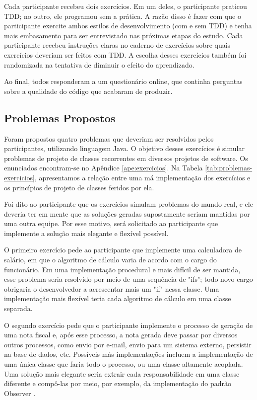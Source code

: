 \documentclass[conference]{IEEEtran}
\begin{document}
Cada participante recebeu dois exercícios. Em um deles, o participante praticou TDD; no outro,
ele programou sem a prática. A razão disso
é fazer com que o participante exercite ambos estilos de desenvolvimento (com e sem TDD)
e tenha mais embasamento para ser entrevistado nas próximas etapas do estudo. 
Cada participante recebeu instruções claras no caderno de exercícios 
sobre quais exercícios deveriam ser feitos
com TDD. A escolha desses exercícios também foi randomizada na tentativa de diminuir
o efeito do aprendizado.

Ao final, todos responderam a um questionário online, 
que continha perguntas sobre a qualidade
do código que acabaram de produzir.

\subsection{Problemas Propostos}
\label{sec:exercicios}

Foram propostos quatro problemas que deveriam ser resolvidos pelos participantes, utilizando
linguagem Java. O objetivo desses exercícios é simular problemas de projeto de classes 
recorrentes em diversos projetos de software. Os enunciados encontram-se no Apêndice 
\ref{ape:exercicios}.
Na Tabela \ref{tab:problemas-exercicios}, apresentamos a relação entre uma má
implementação dos exercícios e os princípios de projeto de classes feridos por
ela.

Foi dito ao participante que os exercícios simulam problemas do mundo real, e ele deveria
ter em mente que as soluções geradas supostamente seriam mantidas por uma outra equipe.
Por esse motivo, será solicitado ao participante que implemente a solução mais elegante e flexível 
possível.

O primeiro exercício pede ao participante que implemente uma calculadora de salário, em que
o algoritmo de cálculo varia de acordo com o cargo do funcionário. Em uma implementação
procedural e mais difícil de ser mantida, esse problema seria resolvido por meio de uma
sequência de "ifs"; todo novo cargo obrigaria o desenvolvedor a acrescentar mais um "if" 
nessa classe. Uma implementação mais flexível teria cada algoritmo de cálculo em uma 
classe separada.

O segundo exercício pede que o participante implemente o processo de geração de uma nota fiscal e, após
esse processo, a nota gerada deve passar por diversos outros processos, como envio por e-mail, envio
para um sistema externo, persistir na base de dados, etc. Possíveis más implementações incluem a 
implementação de uma única classe que faria todo o processo, ou uma classe altamente acoplada.
Uma solução mais elegante seria extrair cada responsabilidade em uma classe diferente e compô-las
por meio, por exemplo, da implementação do padrão Observer \cite{gof}.
\end{document}
